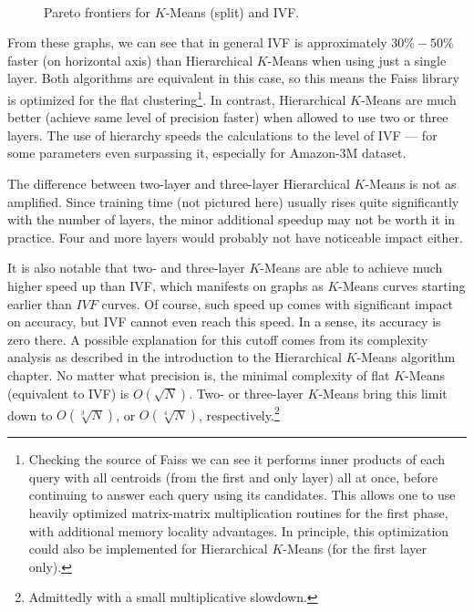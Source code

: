 \begin{figure}
	\centering
	\\
	\caption{Pareto frontiers for $K$-Means (split) and IVF.}
\end{figure}

From these graphs, we can see that in general IVF is approximately $30\% - 50\%$ faster
(on horizontal axis) than Hierarchical $K$-Means when using just a single layer. Both algorithms are
equivalent in this case, so this means the Faiss library is optimized for the flat clustering\footnote{
Checking the source of Faiss we can see it performs inner products of each query with all centroids
(from the first and only layer) all at once, before continuing to answer each query 
using its candidates. This allows one to use heavily optimized matrix-matrix multiplication
routines for the first phase, with additional memory locality advantages. 
In principle, this optimization
could also be implemented for Hierarchical $K$-Means (for the first layer only).
}.
In contrast, Hierarchical $K$-Means are much better (achieve same level of precision faster)
when allowed to use two or three layers. The use of hierarchy speeds the calculations to the level 
of IVF --- for some parameters even surpassing
it, especially for Amazon-3M dataset.

The difference between two-layer and three-layer Hierarchical $K$-Means is not as amplified. Since
training time (not pictured here) usually rises quite significantly with the number of layers,
the minor additional speedup may not be worth it in practice. Four and more layers
would probably not have noticeable impact either.

It is also notable that two- and three-layer $K$-Means are able to achieve much higher speed up
than IVF, which manifests on graphs as $K$-Means curves starting earlier than $IVF$ curves. 
Of course, such speed up comes with significant impact on accuracy, but
IVF cannot even reach this speed. In a sense, its accuracy is zero there.
A possible explanation for this cutoff comes from its complexity analysis as described
in the introduction to the Hierarchical $K$-Means algorithm chapter. No matter what precision is, the minimal
complexity of flat $K$-Means (equivalent to IVF) is $O(\sqrt{N})$. Two- or three-layer
$K$-Means bring this limit down to $O(\sqrt[3]{N})$, or $O(\sqrt[4]{N})$, 
respectively.\footnote{Admittedly with a small multiplicative slowdown.}


